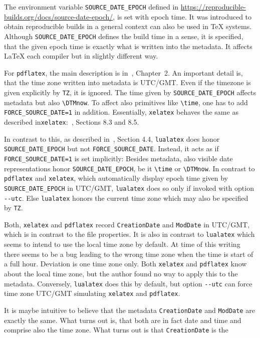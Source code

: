 \documentclass[a4paper, english]{article}%
\newcommand{\pdflatex}{\texttt{pdflatex}}
\newcommand{\lualatex}{\texttt{lualatex}}
\newcommand{\xelatex}{\texttt{xelatex}}
\newcommand{\cmd}[1]{\texttt{\textbackslash#1}}
\begin{document}
The environment variable \texttt{SOURCE\_DATE\_EPOCH} 
defined in \url{https://reproducible-builds.org/docs/source-date-epoch/}, 
is set with epoch time. 
It was introduced to obtain reproducible builds in a general context 
can also be used in \TeX{} systems. 
Although \texttt{SOURCE\_DATE\_EPOCH} defines the build time in a sense, 
it is specified, that the given epoch time is exactly what is written into the metadata. 
It affects \LaTeX{} each compiler but in slightly different way. 

For \pdflatex, the main description is in~\cite{PdfTexUsr24}, Chapter~2.
An important detail is, that the time zone written into metadata is UTC/GMT. 
Even if the timezone is given explicitly by \texttt{TZ}, it is ignored. 
The time given by \texttt{SOURCE\_DATE\_EPOCH} affects metadata but also \cmd{DTMnow}. 
To affect also primitives like \cmd{time}, 
one has to add \texttt{FORCE\_SOURCE\_DATE=1} in addition. 
Essentially, \xelatex{} behaves the same as described in\xelatex:~\cite{XeTexRef24}, Sections 8.3 and 8.5. 

In contrast to this, as described in~\cite{LuaTexRef24}, Section 4.4, 
\lualatex{} does honor \texttt{SOURCE\_DATE\_EPOCH} but not \texttt{FORCE\_SOURCE\_DATE}. 
Instead, it acts as if \texttt{FORCE\_SOURCE\_DATE=1} is set implicitly: 
Besides metadata, also visible date representations honor \texttt{SOURCE\_DATE\_EPOCH}, 
be it \cmd{time} or \cmd{DTMnow}. 
In contrast to \pdflatex{} and \xelatex, 
which automatically display epoch time given by \texttt{SOURCE\_DATE\_EPOCH} in UTC/GMT, 
\lualatex{} does so only if invoked with option \texttt{-{}-utc}. 
Else \lualatex{} honors the current time zone 
which may also be specified by \texttt{TZ}. 


Both, \xelatex{} and \pdflatex{} record \texttt{CreationDate} and \texttt{ModDate} 
in UTC/GMT, which is in contrast to the file properties. 
It is also in contrast to \lualatex{} which seems to intend to use the local time zone by default. 
At time of this writing there seems to be a bug leading to the wrong time zone 
when the time is start of a full hour. 
Deviation is one time zone only. 
Both \xelatex{} and \pdflatex{} know about the local time zone, 
but the author found no way to apply this to the metadata. 
Conversely, \lualatex{} does this by default, but option \texttt{-{}-utc} 
can force time zone UTC/GMT simulating \xelatex{} and \pdflatex. 


It is maybe intuitive to believe that the metadata \texttt{CreationDate} 
and \texttt{ModDate} are exactly the same. 
What turns out is, that both are in fact date and time and comprise also the time zone. 
What turns out is that \texttt{CreationDate} is the 
\end{document}
